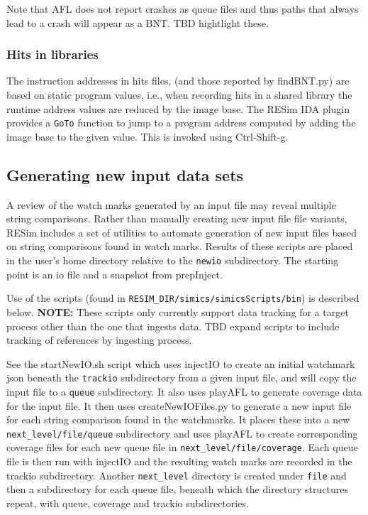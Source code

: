 \documentclass[titlepage]{article}
\begin{document}
Note that AFL does not report crashes as queue files and thus paths that always lead to a crash will appear as a BNT.  TBD hightlight these.

\subsubsection{Hits in libraries}
The instruction addresses in hits files, (and those reported by findBNT.py) are based on static program values, i.e., when recording hits 
in a shared library the runtime address values are reduced by the image base. 
The RESim IDA plugin provides a {\tt GoTo} function to jump to a program address computed by adding the image base to the given value.  This is invoked using Ctrl-Shift-g.

\subsection{Generating new input data sets}
\label{new-inputs}
A review of the watch marks generated by an input file may reveal multiple string comparisons.  Rather than manually creating new input file file variants, RESim
includes a set of utilities to automate generation of new input files based on string comparisons found in watch marks.  Results of these scripts are placed
in the user's home directory relative to the {\tt newio} subdirectory.  The starting point is an io file and a snapshot from prepInject.

Use of the scripts (found in {\tt RESIM\_DIR/simics/simicsScripts/bin}) is described below.  
\textbf{NOTE:} These scripts only currently support data tracking for a target process other than the one that ingests data. TBD expand
scripts to include tracking of references by ingesting process.

See the startNewIO.sh script which uses injectIO to create an initial watchmark json beneath the {\tt trackio} subdirectory from a given input file, and will 
copy the input file to a {\tt queue} subdirectory.  It also uses playAFL to generate coverage data for the input file.  It then uses createNewIOFiles.py to
generate a new input file for each string comparison found in the watchmarks.  It places these into a new {\tt next\_level/file/queue} subdirectory and 
uses playAFL to create corresponding coverage files for each new queue file in {\tt next\_level/file/coverage}. Each queue file is then run with 
injectIO and the resulting watch marks are recorded in the trackio subdirectory.  Another {\tt next\_level} directory is created under {\tt file} and then
a subdirectory for each queue file, beneath which the directory structures repeat, with queue, coverage and trackio subdirectories.
\end{document}
